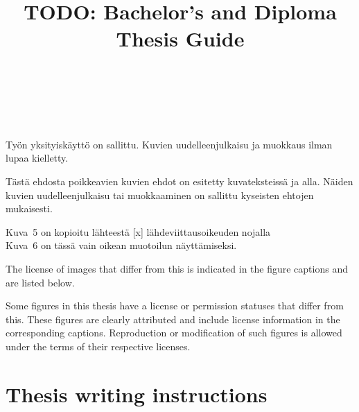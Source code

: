 \documentclass[english, cse, master]{dithesis}
\title{TODO: Bachelor's and Diploma Thesis Guide}
\newcommand{\crpar}{\vspace{1\baselineskip}\par\noindent}
\begin{document}
\hypersetup{pageanchor=false}
\maketitlepage
{}
\setcounter{page}{1}
\hypersetup{pageanchor=true}
\makecopyrightpage
{}
\copyrighttext%
{\copyrightstring\ \allrightsreservedfin}%
{%
  \copyrightstring\ \allrightsreservedfin
  \crpar
  Työn yksityiskäyttö on sallittu. Kuvien uudelleenjulkaisu ja
  muokkaus ilman lupaa kielletty.
  \crpar
  Tästä ehdosta poikkeavien kuvien ehdot on esitetty kuvateksteissä
  ja alla. Näiden kuvien uudelleenjulkaisu tai muokkaaminen on
  sallittu kyseisten ehtojen mukaisesti.
  \crpar
  Kuva~5 on kopioitu lähteestä [x] lähdeviittausoikeuden nojalla \\
  Kuva~6 on tässä vain oikean muotoilun näyttämiseksi.
}
\makecopyrightpage

{%
  \copyrightstring
  \doclicenseThis %
  \crpar
  The license of images that differ from this is indicated in the
  figure captions and are listed below.\par
}
\makecopyrightpage
{}
\makeatletter\makeatother
{}%
{%
  \copyrightstring
  \doclicenseThis %
  \crpar
  Some figures in this thesis have a license or permission statuses
  that differ from this. These figures are clearly attributed and
  include license information in the corresponding captions.
  Reproduction or modification of such figures is allowed under the
  terms of their respective licenses.
}
\makecopyrightpage
{}
\chapter{Thesis writing instructions}
\label{implementation}

\printbibliography[heading=bibnumbered, title=\mybibname]
\end{document}
